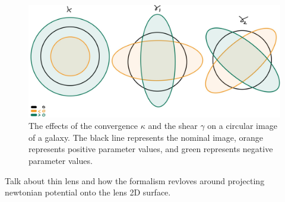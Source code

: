 \begin{figure}
    \begin{center}
      \includegraphics[width=\textwidth]{figs/shear-11.jpg}
    \end{center}
    \caption{The effects of the convergence $\kappa$ and  the shear $\gamma$ on a circular image of a galaxy. The black line represents the nominal image, orange represents positive parameter values, and green represents negative parameter values.}
    \label{fig:shears}
\end{figure}


\par Talk about thin lens and how the formalism revloves around projecting newtonian potential onto the lens 2D surface.\cite{basicLens}
